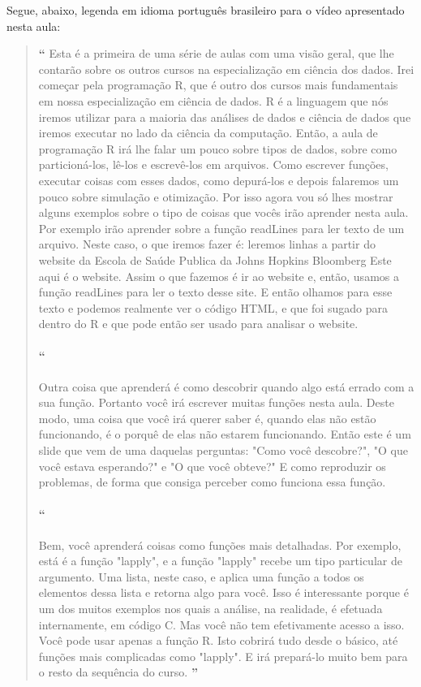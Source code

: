 Segue, abaixo, legenda em idioma português brasileiro para o vídeo apresentado nesta aula:

\begin{quotation}%
\begin{small}
{\large\textbf{``}}%
Esta é a primeira de uma série de aulas com uma visão geral, que lhe contarão sobre os outros cursos na especialização em ciência dos dados. Irei começar pela programação R, que é outro dos cursos mais fundamentais em nossa especialização em ciência de dados. R é a linguagem que nós iremos utilizar para a maioria das análises de dados e ciência de dados que iremos executar no lado da ciência da computação. Então, a aula de programação R irá lhe falar um pouco sobre tipos de dados, sobre como particioná-los, lê-los e escrevê-los em arquivos. Como escrever funções, executar coisas com esses dados,  como depurá-los e depois falaremos um pouco sobre simulação e otimização. Por isso agora vou só lhes mostrar alguns exemplos sobre o tipo de coisas que vocês irão aprender nesta aula. Por exemplo irão aprender sobre a função readLines para ler texto de um arquivo. Neste caso, o que iremos fazer é: leremos linhas a partir do website da Escola de Saúde Publica da Johns Hopkins Bloomberg  Este aqui é o website. Assim o que fazemos é ir ao website e, então, usamos a função readLines para ler o texto desse site. E então olhamos para esse texto e podemos realmente ver o código HTML, e que foi sugado para dentro do R e que pode então ser usado para analisar o website. 

\paragraph{``}
Outra coisa que aprenderá é como descobrir quando algo está errado com a sua função. Portanto você irá escrever muitas funções nesta aula. Deste modo, uma coisa que você irá querer saber é, quando elas não estão funcionando, é o porquê de elas não estarem funcionando. Então este é um slide que vem de uma daquelas perguntas: "Como você descobre?", "O que você estava esperando?" e "O que você obteve?" E como reproduzir os problemas, de forma que consiga perceber como funciona essa função. 

\paragraph{``}
Bem, você aprenderá coisas como funções mais detalhadas. Por exemplo, está é a função "lapply", e a função "lapply" recebe um tipo particular de argumento. Uma lista, neste caso, e aplica uma função a todos os elementos dessa lista e retorna algo para você. Isso é interessante porque é um dos muitos exemplos  nos quais a análise, na realidade, é efetuada internamente, em código C. Mas você não tem efetivamente acesso a isso. Você pode usar apenas a função R. Isto cobrirá tudo desde o básico, até funções mais complicadas como "lapply". E irá prepará-lo muito bem para o resto da sequência do curso. 
{\large\textbf{''}}
\end{small}
\end{quotation}


